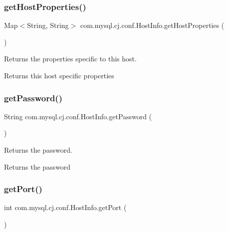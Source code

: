 \subsubsection{\texorpdfstring{get\+Host\+Properties()}{getHostProperties()}}
{\footnotesize\ttfamily Map$<$String, String$>$ com.\+mysql.\+cj.\+conf.\+Host\+Info.\+get\+Host\+Properties (\begin{DoxyParamCaption}{ }\end{DoxyParamCaption})}

Returns the properties specific to this host.

\begin{DoxyReturn}{Returns}
this host specific properties 
\end{DoxyReturn}
\mbox{\label{classcom_1_1mysql_1_1cj_1_1conf_1_1_host_info_aebe3979385ac27249cae703ec4c5ea6c}} 
\subsubsection{\texorpdfstring{get\+Password()}{getPassword()}}
{\footnotesize\ttfamily String com.\+mysql.\+cj.\+conf.\+Host\+Info.\+get\+Password (\begin{DoxyParamCaption}{ }\end{DoxyParamCaption})}

Returns the password.

\begin{DoxyReturn}{Returns}
the password 
\end{DoxyReturn}
\mbox{\label{classcom_1_1mysql_1_1cj_1_1conf_1_1_host_info_af0c2b397e445567f8217eb989a9f4fbf}} 
\subsubsection{\texorpdfstring{get\+Port()}{getPort()}}
{\footnotesize\ttfamily int com.\+mysql.\+cj.\+conf.\+Host\+Info.\+get\+Port (\begin{DoxyParamCaption}{ }\end{DoxyParamCaption})}

